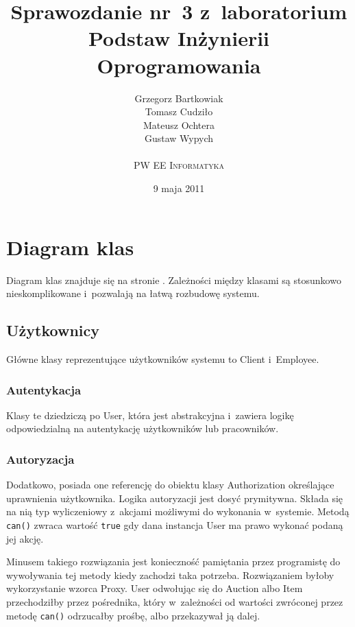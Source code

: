 \documentclass[10pt,a4paper]{article}
\newcommand{\f}[1]{\texttt{#1}}
\newcommand{\s}[1]{\textsf{#1}}
\begin{document}
\title{
  Sprawozdanie nr~3 z~laboratorium\\Podstaw Inżynierii Oprogramowania
}
\author{
  Grzegorz Bartkowiak\\
  Tomasz Cudziło\\
  Mateusz Ochtera\\
  Gustaw Wypych\\
  \\
  \textsc{PW EE Informatyka}\\[10pt]
}
\date{9 maja 2011}
\maketitle

\section{Diagram klas}

Diagram klas znajduje się na stronie \pageref{fig:diagram_klas}. Zależności
między klasami są stosunkowo nieskomplikowane i~pozwalają na łatwą rozbudowę
systemu.

\subsection{Użytkownicy}

Główne klasy reprezentujące użytkowników systemu to \s{Client} i~\s{Employee}.

\subsubsection{Autentykacja}

Klasy te dziedziczą po \s{User}, która jest abstrakcyjna i~zawiera logikę
odpowiedzialną na autentykację użytkowników lub pracowników. 

\subsubsection{Autoryzacja}

Dodatkowo, posiada one referencję do obiektu klasy \s{Authorization}
określające uprawnienia użytkownika. Logika autoryzacji jest dosyć prymitywna.
Składa się na nią typ wyliczeniowy z~akcjami możliwymi do wykonania w~systemie.
Metodą \f{can()} zwraca wartość \f{true} gdy dana instancja \s{User} ma prawo
wykonać podaną jej akcję.

Minusem takiego rozwiązania jest konieczność pamiętania przez programistę do
wywoływania tej metody kiedy zachodzi taka potrzeba. Rozwiązaniem byłoby
wykorzystanie wzorca \s{Proxy}. \s{User} odwołując się do \s{Auction} albo
\s{Item} przechodziłby przez pośrednika, który w~zależności od wartości
zwróconej przez metodę \f{can()} odrzucałby prośbę, albo przekazywał ją dalej.
\end{document}
